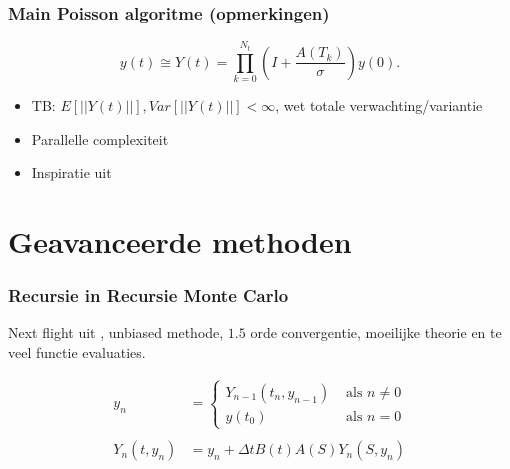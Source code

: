 \documentclass[18pt,aspectratio=149]{beamer}
\begin{document}

\begin{frame}
    \frametitle{Main Poisson algoritme (opmerkingen)}
    \begin{equation}
        y(t) \cong Y(t) =  \prod_{k=0}^{N_{t}}\left(I + \frac{A(T_{k})}{\sigma} \right)    y(0).
    \end{equation}
    \begin{itemize}
        \item TB: $E[||Y(t)||],Var[||Y(t)||]< \infty$, wet totale verwachting/variantie
        \item Parallelle complexiteit
        \item Inspiratie uit \cite{acebron_monte_2016}
    \end{itemize}
\end{frame}

\section{Geavanceerde methoden}

\begin{frame}
    \tableofcontentscurrent
\end{frame}

\begin{frame}
    \frametitle{Recursie in Recursie Monte Carlo}
    Next flight uit \cite{sawhney_grid-free_2022}, unbiased methode, $1.5$ orde convergentie,
    moeilijke theorie en te veel functie evaluaties.
    \begin{center}
    \end{center}
    \vspace{-0.5cm}
    \begin{align}
        y_{n}          & = \begin{cases}
                               Y_{n-1}(t_{n},y_{n-1}) & \text{ als } n \neq 0        \\
                               y(t_{0})               & \text{ als } n = 0 \nonumber
                           \end{cases} \\
        \\
        Y_{n}(t,y_{n}) & = y_{n} + \Delta t B(t) A(S ) Y_{n}(S,y_{n})
    \end{align}
\end{frame}
\end{document}
